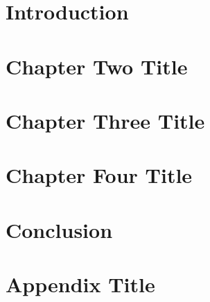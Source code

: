 \documentclass[12pt, twoside]{report}
\begin{document}
	\chapter{Introduction}
	\setcounter{page}{1}
	

	\chapter{Chapter Two Title}
	

	\chapter{Chapter Three Title}
	

	\chapter{Chapter Four Title}
	

	\chapter{Conclusion}
	

	
	

	\appendix
	\chapter{Appendix Title}
	
\end{document}

